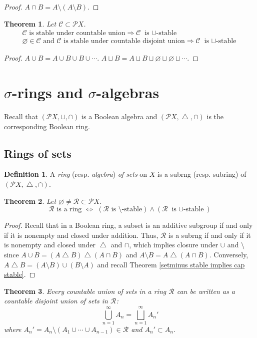\documentclass[11pt, a4paper, openany]{book}
\newtheorem{thm}{Theorem}\newtheorem{lem}{Lemma}\newtheorem{crl}{Corollary}
\theoremstyle{definition}
\newtheorem{define}{Definition}\newtheorem{exam}{Example}\newtheorem{remark}{Remark}
\DeclareMathOperator{\symdif}{\triangle}
\begin{document}
    \begin{proof}
        $A\cap B=A\setminus(A\setminus B)$.
    \end{proof}
    \begin{thm}\label{countable union implies binary union}
        Let $\mathscr{C}\subset\mathscr{P}X$.
        \begin{gather*}
            \mathscr{C}\text{ is stable under countable union}\Longrightarrow \mathscr{C}\text{ is $\cup$-stable}\\
            \varnothing\in\mathscr{C}\text{ and }\mathscr{C}\text{ is stable under countable disjoint union}\Longrightarrow \mathscr{C}\text{ is $\sqcup$-stable}
        \end{gather*}
    \end{thm}
    \begin{proof}
        $A\cup B=A\cup B\cup B\cup\cdots$. $A\sqcup B=A\sqcup B\sqcup \varnothing\sqcup\varnothing\sqcup \cdots$.
    \end{proof}
\section{\texorpdfstring{$\sigma$}{Sigma}-rings and \texorpdfstring{$\sigma$}{sigma}-algebras}
    Recall that $(\mathscr{P}X,\cup,\cap)$ is a Boolean algebra and $(\mathscr{P}X,\symdif,\cap)$ is the corresponding Boolean ring.
\subsection{Rings of sets}
    \begin{define}
        A \textit{ring} (resp. \textit{algebra}) \textit{of sets} on $X$ is a subrng (resp. subring) of $(\mathscr{P}X,\symdif,\cap)$.
    \end{define}
    \begin{thm}\label{characterization of rings}
        Let $\varnothing\neq \mathscr{R}\subset\mathscr{P}X$.
        \[
            \mathscr{R}\text{ is a ring}\,\,\Longleftrightarrow\,\, (\mathscr{R}\text{ is $\setminus$-stable})\wedge (\mathscr{R}\text{ is $\cup$-stable})  %
        \]
    \end{thm}
    \begin{proof}
        Recall that in a Boolean ring, a subset is an additive subgroup if and only if it is nonempty and closed under addition. Thus, $\mathscr{R}$ is a subrng if and only if it is nonempty and closed under $\symdif$ and $\cap$, which implies closure under $\cup$ and $\setminus$ since $A\cup B=(A\symdif B)\symdif(A\cap B)$ and $A\setminus B=A\symdif(A\cap B)$. Conversely, $A\symdif B=(A\setminus B)\cup (B\setminus A)$ and recall Theorem \ref{setminus stable implies cap stable}.
    \end{proof}
    \begin{thm}\label{every countable union is a disjoint union in a ring}
        Every countable union of sets in a ring $\mathscr{R}$ can be written as a countable disjoint union of sets in $\mathscr{R}$:
        \[
            \bigcup_{n=1}^\infty A_n=\bigsqcup_{n=1}^\infty A_n'
        \]
        where $A_n'=A_n\setminus(A_1\cup\cdots \cup A_{n-1})\in\mathscr{R}$ and $A_n'\subset A_n$.
    \end{thm}
\end{document}
